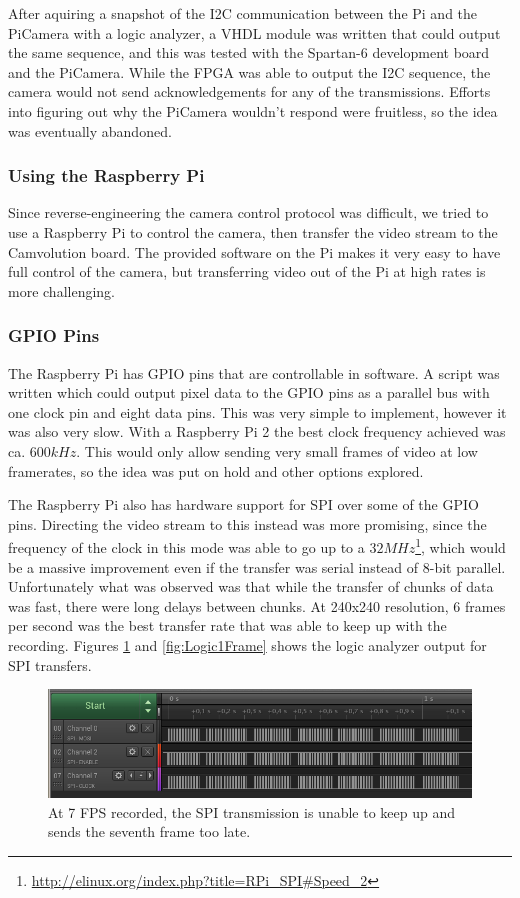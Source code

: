 After aquiring a snapshot of the I2C communication between the Pi and the PiCamera with a logic analyzer,
a VHDL module was written that could output the same sequence,
and this was tested with the Spartan-6 development board and the PiCamera.
While the FPGA was able to output the I2C sequence,
the camera would not send acknowledgements for any of the transmissions.
Efforts into figuring out why the PiCamera wouldn't respond were fruitless, so the idea was eventually abandoned.

\subsubsection{Using the Raspberry Pi}
Since reverse-engineering the camera control protocol was difficult,
we tried to use a Raspberry Pi to control the camera,
then transfer the video stream to the Camvolution board.
The provided software on the Pi makes it very easy to have full control of the camera,
but transferring video out of the Pi at high rates is more challenging.

\subsubsection{GPIO Pins}
The Raspberry Pi has GPIO pins that are controllable in software.
A script was written which could output pixel data to the GPIO pins as a parallel bus with one clock pin and eight data pins.
This was very simple to implement, however it was also very slow.
With a Raspberry Pi 2 the best clock frequency achieved was ca. $600kHz$.
This would only allow sending very small frames of video at low framerates,
so the idea was put on hold and other options explored.

The Raspberry Pi also has hardware support for SPI over some of the GPIO pins.
Directing the video stream to this instead was more promising,
since the frequency of the clock in this mode was able to go up to a $32MHz$\footnote{\url{http://elinux.org/index.php?title=RPi\_SPI\#Speed\_2}},
which would be a massive improvement even if the transfer was serial instead of 8-bit parallel.
Unfortunately what was observed was that while the transfer of chunks of data was fast,
there were long delays between chunks.
At 240x240 resolution, 6 frames per second was the best transfer rate that was able to keep up with the recording.
Figures \ref{fig:Logic7fps} and \ref{fig:Logic1Frame} shows the logic analyzer output for SPI transfers.

\begin{figure}
    \centering
    \includegraphics[width=\linewidth]{img/logic/7fps}
    \caption{At 7 FPS recorded, the SPI transmission is unable to keep up and sends the seventh frame too late.}
    \label{fig:Logic7fps}
\end{figure}

